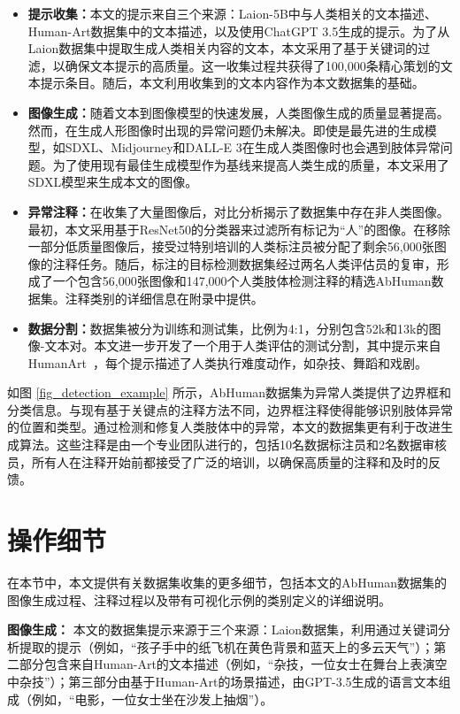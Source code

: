 \begin{itemize}
    \item \textbf{提示收集：}本文的提示来自三个来源：Laion-5B\cite{schuhmann2022laion}中与人类相关的文本描述、Human-Art数据集\cite{ju2023humanART}中的文本描述，以及使用ChatGPT 3.5\cite{GPT_brown2020language}生成的提示。为了从Laion数据集中提取生成人类相关内容的文本，本文采用了基于关键词的过滤，以确保文本提示的高质量。这一收集过程共获得了100,000条精心策划的文本提示条目。随后，本文利用收集到的文本内容作为本文数据集的基础。
    \item \textbf{图像生成：}随着文本到图像模型的快速发展，人类图像生成的质量显著提高。然而，在生成人形图像时出现的异常问题仍未解决。即使是最先进的生成模型，如SDXL\cite{podell2023sdxl}、Midjourney和DALL-E 3\cite{openai2023dalle3}在生成人类图像时也会遇到肢体异常问题。为了使用现有最佳生成模型作为基线来提高人类生成的质量，本文采用了SDXL模型来生成本文的图像。
    \item \textbf{异常注释：}在收集了大量图像后，对比分析揭示了数据集中存在非人类图像。最初，本文采用基于ResNet50的分类器来过滤所有标记为“人”的图像。在移除一部分低质量图像后，接受过特别培训的人类标注员被分配了剩余56,000张图像的注释任务。随后，标注的目标检测数据集经过两名人类评估员的复审，形成了一个包含56,000张图像和147,000个人类肢体检测注释的精选AbHuman数据集。注释类别的详细信息在附录中提供。
    \item \textbf{数据分割：}数据集被分为训练和测试集，比例为4:1，分别包含52k和13k的图像-文本对。本文进一步开发了一个用于人类评估的测试分割，其中提示来自HumanArt~\cite{ju2023humanART}，每个提示描述了人类执行难度动作，如杂技、舞蹈和戏剧。
\end{itemize}

如图 \ref{fig_detection_example} 所示，AbHuman数据集为异常人类提供了边界框和分类信息。与现有基于关键点的注释方法不同，边界框注释使得能够识别肢体异常的位置和类型。通过检测和修复人类肢体中的异常，本文的数据集更有利于改进生成算法。这些注释是由一个专业团队进行的，包括10名数据标注员和2名数据审核员，所有人在注释开始前都接受了广泛的培训，以确保高质量的注释和及时的反馈。




\section{操作细节}
在本节中，本文提供有关数据集收集的更多细节，包括本文的AbHuman数据集的图像生成过程、注释过程以及带有可视化示例的类别定义的详细说明。

\textbf{图像生成：}
本文的数据集提示来源于三个来源：Laion数据集，利用通过关键词分析提取的提示（例如，“孩子手中的纸飞机在黄色背景和蓝天上的多云天气”）；第二部分包含来自Human-Art的文本描述（例如，“杂技，一位女士在舞台上表演空中杂技”）；第三部分由基于Human-Art的场景描述，由GPT-3.5生成的语言文本组成（例如，“电影，一位女士坐在沙发上抽烟”）。

